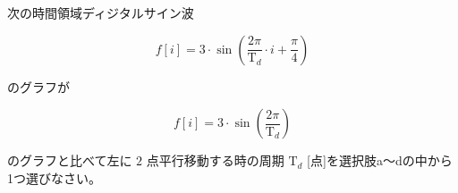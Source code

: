 次の時間領域ディジタルサイン波 

\[
f[i] = 3 \cdot \sin \left ( \frac{2 \pi}{\textrm{T}_d}  \cdot i + \frac{\pi}{4} \right )
\]

\noindent のグラフが

\[
f[i] = 3 \cdot \sin \left ( \frac{2 \pi}{\textrm{T}_d} \right )
\]

\noindent のグラフと比べて左に $2$ 点平行移動する時の周期 $\textrm{T}_d$ [点]を選択肢a〜dの中から1つ選びなさい。
